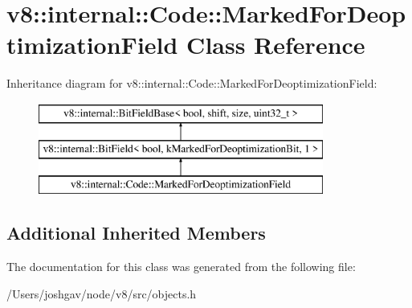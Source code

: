 \hypertarget{classv8_1_1internal_1_1_code_1_1_marked_for_deoptimization_field}{}\section{v8\+:\+:internal\+:\+:Code\+:\+:Marked\+For\+Deoptimization\+Field Class Reference}
\label{classv8_1_1internal_1_1_code_1_1_marked_for_deoptimization_field}
Inheritance diagram for v8\+:\+:internal\+:\+:Code\+:\+:Marked\+For\+Deoptimization\+Field\+:\begin{figure}[H]
\begin{center}
\leavevmode
\includegraphics[height=3.000000cm]{classv8_1_1internal_1_1_code_1_1_marked_for_deoptimization_field}
\end{center}
\end{figure}
\subsection*{Additional Inherited Members}


The documentation for this class was generated from the following file\+:\begin{DoxyCompactItemize}
\item 
/\+Users/joshgav/node/v8/src/objects.\+h\end{DoxyCompactItemize}
